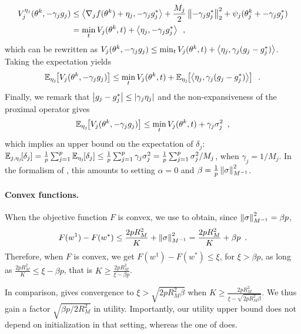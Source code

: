\begin{align}
  V_j^{\eta_j}(\theta^k, -\gamma_j g_j)
   & \le \left\langle \nabla_j f(\theta^k) + \eta_j, -\gamma_j g_j^* \right\rangle + \frac{M_j}{2} \left \lVert -\gamma_j g_j^* \right \rVert_2^2 + \psi_j(\theta^k_j + -\gamma_j g_j^*) \\
   & = \min_t V_j(\theta^k, t) + \left\langle \eta_j, -\gamma_j g_j^* \right\rangle\enspace,
\end{align}
which can be rewritten as $V_j(\theta^k, -\gamma_j g_j) \le \min_t V_j(\theta^k, t) + \left\langle \eta_j, \gamma_j (g_j - g_j^*) \right\rangle$.
Taking the expectation yields
\begin{align}
  \mathbb E_{\eta_j} \hspace{-0.29em} \left[ V_j(\theta^k, -\gamma_j g_j) \right] \le \min_t V_j(\theta^k, t) + \mathbb E_{\eta_j} \hspace{-0.29em} \left[ \left\langle \eta_j, \gamma_j (g_j - g_j^*) \right\rangle \right]\enspace.
\end{align}
Finally, we remark that $\left| g_j - g_j^* \right| \le \left| \gamma_j \eta_j \right|$ and the
non-expansiveness of the proximal operator gives
\begin{align}
  \mathbb E_{\eta_j} \hspace{-0.29em} \left[ V_j(\theta^k, -\gamma_j g_j) \right] \le \min_t V_j(\theta^k, t) + \gamma_j \sigma_j^2\enspace,
\end{align}
which implies an upper bound on the expectation of $\delta_j$:
$\mathbb E_{j,\eta_j} \hspace{-0.29em} \left[ \delta_j \right]
  = \frac{1}{p} \sum_{j=1}^p \mathbb E_{\eta_j} \hspace{-0.29em} \left[ \delta_j \right]
  \le \frac{1}{p} \sum_{j=1}^p \gamma_j \sigma_j^2 = \frac{1}{p} \sum_{j=1}^p \sigma_j^2 / M_j$,
when $\gamma_j = 1/M_j$.
In the formalism of \citet{tappenden2016Inexact},
this amounts to setting $\alpha = 0$ and $\beta = \frac{1}{p} \left \lVert \sigma \right \rVert_{M^{-1}}^2$.

\paragraph{Convex functions.}

When the objective function $F$ is convex, we use 
to obtain, since $\left \lVert \sigma \right \rVert_{M^{-1}}^2 = \beta p$,
\begin{align}
  F(w^{1}) - F(w^*) \le \frac{2pR_M^2}{K} + \left \lVert \sigma \right \rVert_{M^{-1}}^2
  = \frac{2pR_M^2}{K} + \beta p\enspace.
\end{align}
Therefore, when $F$ is convex, we get $F(w^1) - F(w^*) \le \xi$, for $\xi > \beta p$,
as long as $\frac{2pR_M^2}{K} \le \xi - \beta p$, that is $K \ge \frac{2pR_M^2}{\xi - \beta p}$.

In comparison, \citet[Theorem 5.1 therein]{tappenden2016Inexact} gives
convergence
to $\xi > \sqrt{2pR_M^2 \beta}$ when $K \ge \frac{2pR_M^2}{\xi - \sqrt{2pR_M^2\beta} }$.
We thus gain a factor $\sqrt{\beta p / 2R_M^2}$ in utility.
Importantly, our utility upper bound does not depend on initialization in that
setting, whereas the one of \citet{tappenden2016Inexact} does.



